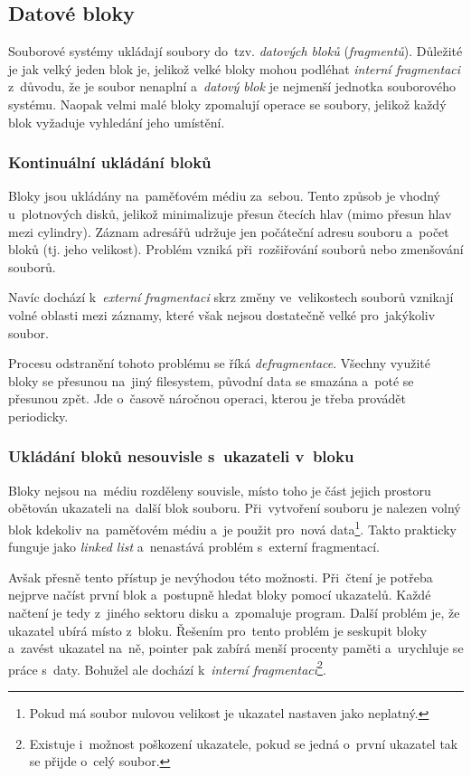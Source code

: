 \subsection{Datové bloky}

Souborové systémy ukládají soubory do~tzv. \emph{datových bloků} (\emph{fragmentů}). Důležité je jak velký jeden blok je, jelikož velké bloky mohou podléhat \emph{interní fragmentaci} z~důvodu, že je soubor nenaplní a~\emph{datový blok} je nejmenší jednotka souborového systému. Naopak velmi malé bloky zpomalují operace se soubory, jelikož každý blok vyžaduje vyhledání jeho umístění.

\subsubsection{Kontinuální ukládání bloků}

Bloky jsou ukládány na~paměťovém médiu za~sebou. Tento způsob je vhodný u~plotnových disků, jelikož minimalizuje přesun čtecích hlav (mimo přesun hlav mezi cylindry). Záznam adresářů udržuje jen počáteční adresu souboru a~počet bloků (tj. jeho velikost). Problém vzniká při~rozšiřování souborů nebo zmenšování souborů.

Navíc dochází k~\emph{externí fragmentaci} skrz změny ve~velikostech souborů vznikají volné oblasti mezi záznamy, které však nejsou dostatečně velké pro~jakýkoliv soubor.

Procesu odstranění tohoto problému se říká \emph{defragmentace}. Všechny využité bloky se přesunou na~jiný filesystem, původní data se smazána a~poté se přesunou zpět. Jde o~časově náročnou operaci, kterou je třeba provádět periodicky.

\subsubsection{Ukládání bloků nesouvisle s~ukazateli v~bloku}

Bloky nejsou na~médiu rozděleny souvisle, místo toho je část jejich prostoru obětován ukazateli na~další blok souboru. Při~vytvoření souboru je nalezen volný blok kdekoliv na~paměťovém médiu a~je použit pro~nová data\footnote{Pokud má soubor nulovou velikost je ukazatel nastaven jako neplatný.}. Takto prakticky funguje jako \emph{linked list} a~nenastává problém s~externí fragmentací.

Avšak přesně tento přístup je nevýhodou této možnosti. Při~čtení je potřeba nejprve načíst první blok a~postupně hledat bloky pomocí ukazatelů. Každé načtení je tedy z~jiného sektoru disku a~zpomaluje program. Další problém je, že ukazatel ubírá místo z~bloku. Řešením pro~tento problém je seskupit bloky a~zavést ukazatel na~ně, pointer pak zabírá menší procenty paměti a~urychluje se práce s~daty. Bohužel ale dochází k~\emph{interní fragmentaci}\footnote{Existuje i~možnost poškození ukazatele, pokud se jedná o~první ukazatel tak se přijde o~celý soubor.}.

